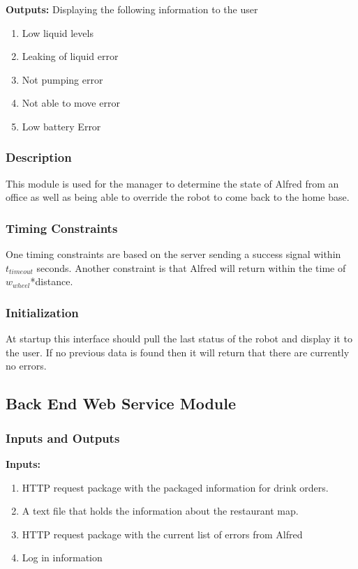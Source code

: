 \documentclass [10pt]{article}
\begin{document}
\textbf{Outputs: } Displaying the following information to the user
\begin{enumerate}
	\item Low liquid levels
	\item Leaking of liquid error
	\item Not pumping error
	\item Not able to move error
	\item Low battery Error
\end{enumerate}
\subsubsection{Description}
This module is used for the manager to determine the state of Alfred from an office as well as being able to override the robot to come back to the home base. 
\subsubsection{Timing Constraints}
One timing constraints are based on the server sending a success signal within  $ t_{timeout} $ seconds. Another constraint is that Alfred will return within the time of $ w_{wheel} $*distance.

\subsubsection{Initialization}
At startup this interface should pull the last status of the robot and display it to the user. If no previous data is found then it will return that there are currently no errors.

\subsection{Back End Web Service Module}

\subsubsection{Inputs and Outputs}

\textbf{Inputs: } 
\begin{enumerate}
	\item HTTP request package with the packaged information for drink orders.
	\item A text file that holds the information about the restaurant map.
	\item HTTP request package with the current list of errors from Alfred
	\item Log in information
\end{enumerate}
\end{document}
